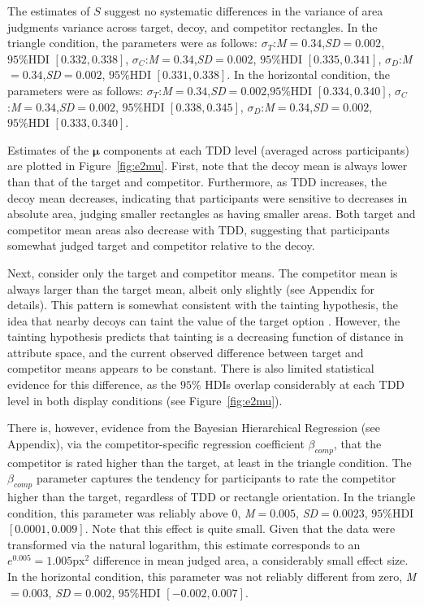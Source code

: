 The estimates of $S$ suggest no systematic differences in the variance of area judgments variance across target, decoy, and competitor rectangles. In the triangle condition, the parameters were as follows: $\sigma_{T}$:\textit{M}$=0.34$,\textit{SD}$=0.002$, $95\%\text{HDI}$ $[0.332,0.338]$, $\sigma_{C}$:\textit{M}$=0.34$,\textit{SD}$=0.002$, $95\%\text{HDI}$ $[0.335,0.341]$, $\sigma_{D}$:\textit{M}$=0.34$,\textit{SD}$=0.002$, $95\%\text{HDI}$ $[0.331,0.338]$. In the horizontal condition, the parameters were as follows: $\sigma_{T}$:\textit{M}$=0.34$,\textit{SD}$=0.002$,$95\%\text{HDI}$ $[0.334,0.340]$, $\sigma_{C}$:\textit{M}$=0.34$,\textit{SD}$=0.002$, $95\%\text{HDI}$ $[0.338,0.345]$, $\sigma_{D}$:\textit{M}$=0.34$,\textit{SD}$=0.002$, $95\%\text{HDI}$ $[0.333,0.340]$. 

Estimates of the $\boldsymbol{\mu}$ components at each TDD level (averaged across participants) are plotted in Figure~\ref{fig:e2mu}. First, note that the decoy mean is always lower than that of the target and competitor. Furthermore, as TDD increases, the decoy mean decreases, indicating that participants were sensitive to decreases in absolute area, judging smaller rectangles as having smaller areas. Both target and competitor mean areas also decrease with TDD, suggesting that participants somewhat judged target and competitor relative to the decoy. 

Next, consider only the target and competitor means. The competitor mean is always larger than the target mean, albeit only slightly (see Appendix for details). This pattern is somewhat consistent with the tainting hypothesis, the idea that nearby decoys can taint the value of the target option \parencite{frederick2008attraction,simonson2014vices}. However, the tainting hypothesis predicts that tainting is a decreasing function of distance in attribute space, and the current observed difference between target and competitor means appears to be constant. There is also limited statistical evidence for this difference, as the $95\%$ HDIs overlap considerably at each TDD level in both display conditions (see Figure~\ref{fig:e2mu}). 

There is, however, evidence from the Bayesian Hierarchical Regression (see Appendix), via the competitor-specific regression coefficient $\beta_{comp}$, that the competitor is rated higher than the target, at least in the triangle condition. The $\beta_{comp}$ parameter captures the tendency for participants to rate the competitor higher than the target, regardless of TDD or rectangle orientation. In the triangle condition, this parameter was reliably above 0, \textit{M}$=0.005$, \textit{SD}$=0.0023$, $95\%\text{HDI}$ $[0.0001,0.009]$. Note that this effect is quite small. Given that the data were transformed via the natural logarithm, this estimate corresponds to an $e^{0.005}=1.005\text{px}^2$ difference in mean judged area, a considerably small effect size. In the horizontal condition, this parameter was not reliably different from zero, \textit{M}$=0.003$, \textit{SD}$=0.002$, $95\%\text{HDI}$ $[-0.002,0.007]$. 

